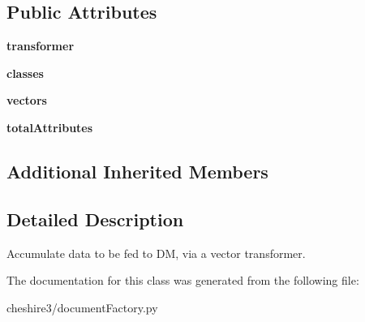 \subsection*{Public Attributes}
\begin{DoxyCompactItemize}
\item 
\hypertarget{classcheshire3_1_1document_factory_1_1_acc_vector_transformer_stream_a24e14beb27f78cccaf5f0fa3b747b123}{{\bfseries transformer}}\label{classcheshire3_1_1document_factory_1_1_acc_vector_transformer_stream_a24e14beb27f78cccaf5f0fa3b747b123}

\item 
\hypertarget{classcheshire3_1_1document_factory_1_1_acc_vector_transformer_stream_af33445306a4fbe3ab06add2eb47c4b77}{{\bfseries classes}}\label{classcheshire3_1_1document_factory_1_1_acc_vector_transformer_stream_af33445306a4fbe3ab06add2eb47c4b77}

\item 
\hypertarget{classcheshire3_1_1document_factory_1_1_acc_vector_transformer_stream_a63e9889aeb9a57e72856f44442724e88}{{\bfseries vectors}}\label{classcheshire3_1_1document_factory_1_1_acc_vector_transformer_stream_a63e9889aeb9a57e72856f44442724e88}

\item 
\hypertarget{classcheshire3_1_1document_factory_1_1_acc_vector_transformer_stream_ae98c8650ad81e8eaf2f63ce760692d99}{{\bfseries total\-Attributes}}\label{classcheshire3_1_1document_factory_1_1_acc_vector_transformer_stream_ae98c8650ad81e8eaf2f63ce760692d99}

\end{DoxyCompactItemize}
\subsection*{Additional Inherited Members}


\subsection{Detailed Description}
\begin{DoxyVerb}Accumulate data to be fed to DM, via a vector transformer.\end{DoxyVerb}
 

The documentation for this class was generated from the following file\-:\begin{DoxyCompactItemize}
\item 
cheshire3/document\-Factory.\-py\end{DoxyCompactItemize}
